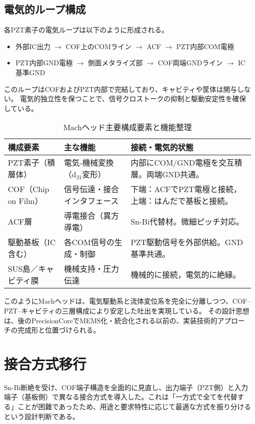 \documentclass[conference]{IEEEtran}
\begin{document}
\subsection{電気的ループ構成}
各PZT素子の電気ループは以下のように形成される。  
\begin{itemize}
  \item 外部IC出力 $\rightarrow$ COF上のCOMライン $\rightarrow$ ACF $\rightarrow$ PZT内部COM電極
  \item PZT内部GND電極 $\rightarrow$ 側面メタライズ部 $\rightarrow$ COF両端GNDライン $\rightarrow$ IC基準GND
\end{itemize}
このループはCOFおよびPZT内部で完結しており、キャビティや筐体は関与しない。  
電気的独立性を保つことで、信号クロストークの抑制と駆動安定性を確保している。

\begin{table}[t]
\centering
\footnotesize
\caption{Machヘッド主要構成要素と機能整理}
\label{tab:mach-structure}
\renewcommand{\arraystretch}{1.1}
\begin{tabularx}{\columnwidth}{@{}p{2.2cm} Y Y@{}}
\toprule
構成要素 & 主な機能 & 接続・電気的状態 \\
\midrule
PZT素子（積層体） & 電気-機械変換（d$_{31}$変形） & 内部にCOM/GND電極を交互積層。両端GND共通。 \\
COF（Chip on Film） & 信号伝達・接合インタフェース & 下端：ACFでPZT電極と接続，上端：はんだで基板と接続。 \\
ACF層 & 導電接合（異方導電） & Sn-Bi代替材。微細ピッチ対応。 \\
駆動基板（IC含む） & 各COM信号の生成・制御 & PZT駆動信号を外部供給。GND基準共通。 \\
SUS島／キャビティ膜 & 機械支持・圧力伝達 & 機械的に接続，電気的に絶縁。 \\
\bottomrule
\end{tabularx}
\end{table}

このようにMachヘッドは、電気駆動系と流体変位系を完全に分離しつつ、COF–PZT–キャビティの三層構成により安定した吐出を実現している。  
その設計思想は、後のPrecisionCoreでMEMS化・統合化される以前の、実装技術的アプローチの完成形と位置づけられる。

\section{接合方式移行}
Sn-Bi断絶を受け、COF端子構造を全面的に見直し、出力端子（PZT側）と入力端子（基板側）で異なる接合方式を導入した。これは「一方式で全てを代替する」ことが困難であったため、用途と要求特性に応じて最適な方式を振り分けるという設計判断である。
\end{document}
